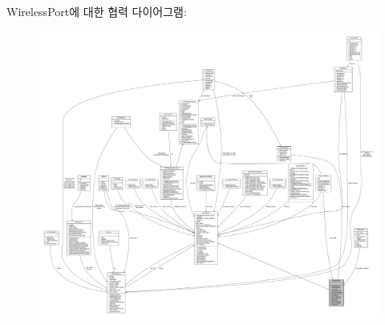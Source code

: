 Wireless\+Port에 대한 협력 다이어그램\+:
\nopagebreak
\begin{figure}[H]
\begin{center}
\leavevmode
\includegraphics[width=350pt]{class_wireless_port__coll__graph}
\end{center}
\end{figure}
